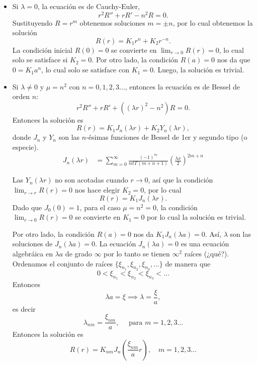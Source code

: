 \documentclass[11pt,letterpaper]{report}
\newcommand\<{\langle}
\renewcommand\>{\rangle}
\begin{document}
\begin{itemize}
  \item Si $\lambda=0$, la ecuación es de Cauchy-Euler,
    \[
      r^{2}R''+rR'-n^{2}R = 0
    .\]
    Sustituyendo $R=r^m$ obtenemos soluciones $m=\pm n$, por lo
    cual obtenemos la solución
    \[
      R(r) = K_1r^n+K_2r^{-n}
    .\]
    La condición inicial $R(0)=0$ se convierte en $\lim_{r\to
    0}R(r)=0$, lo cual solo se satisface si $K_2=0$.
    Por otro lado, la condición $R(a)=0$ nos da que $0=K_1a^n$,
    lo cual solo se satisface con $K_1=0$.
    Luego, la solución es trivial.

  \item Si $\lambda\neq 0$ y $\mu=n^{2}$ con
    $n=0,1,2,3\dots$, entonces la ecuación es de
    Bessel de orden $n$:
    \[
      r^{2}R'' +rR' +((\lambda r)^{2}-n^{2})R = 0
    .\]
    Entonces la solución es
    \[
      R(r)
      =
      K_1J_n(\lambda r)
      +
      K_2Y_n(\lambda r)
    ,\]
    donde $J_n$ y $Y_n$ son las $n$-ésimas funciones de
    Bessel de 1er y segundo tipo (o especie).
    \begin{align*}
      J_n(\lambda r)
      &= \sum_{m=0}^{\infty}\frac{(-1)^m}{m!\Gamma(m+n+1)}
      \left(
        \frac{\lambda x}{2}
      \right)^{2m+n}
    \end{align*}

    Las $Y_n(\lambda r)$ no son acotadas cuando $r\to 0$,
    así que la condición $\lim_{r\to r}R(r)=0$ nos hace
    elegir $K_2=0$, por lo cual
    \[
      R(r)=K_1J_n(\lambda r)
    .\]
    Dado que $J_0(0) = 1$, para el caso $\mu = n^2 = 0$, la condición
    $\lim_{r\to 0} R(r) = 0$ se convierte en $K_1 = 0$ por lo cual la
    solución es trivial.
    
    Por otro lado, la condición $R(a)=0$ nos da
    $K_1J_n(\lambda a)=0$.
    Así, $\lambda$ son las soluciones de $J_n(\lambda a)=0$.
    La ecuación $J_n(\lambda a) = 0$ es una ecuación algebráica en
    $\lambda a$ de grado $\infty$ por lo tanto se tienen $\infty^2$
    raíces (¿qué?). Ordenamos el conjunto de raíces
    $\{ \xi_{n_1}, \xi_{n_2}, \xi_{n_3}, \dots\}$ de manera que
    \[
      0 < \xi_{n_1} < \xi_{n_2} < \xi_{n_3} < \dots
    \] Entonces
    \[
    \lambda a = \xi \implies \lambda = \frac{\xi}{a},
    \] es decir
    \[
      \lambda_{nm} = \frac{\xi_{nm}}{a}, \quad \text{ para } m = 1,2,3\dots
    \] Entonces la solución es
    \[
      R(r) = K_{nm} J_n\left(\frac{\xi_{nm}}{a}r\right), \quad m = 1,2,3 \dots
    \] 
\end{itemize}
\end{document}
